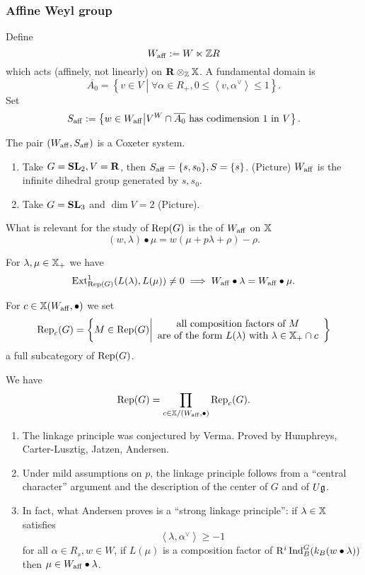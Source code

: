 \subsubsection{Affine Weyl group}
Define
\[
	W_{\mathrm{aff}} := W\ltimes \mathbb Z R
\] 
which acts (affinely, not linearly) on $\mathbf{R}\otimes_\mathbb Z \mathbb{X}$. A fundamental domain is
\[
	\overline{A_0} = \left\{ v\in V \middle| \forall \alpha\in R_+, 0\le \left<v,\alpha ^{\vee} \right>\le 1 \right\} .
\] 
Set
\[
S_{\mathrm{aff}}:= \left\{ w\in W_{\mathrm{aff}} \middle| V^{W}\cap \overline{A_0}\text{ has codimension 1 in }V \right\}. 
\] 
\begin{fact}
	The pair $(W_{\mathrm{aff}},S_{\mathrm{aff}})$ is a Coxeter system.
\end{fact}
\begin{example}\leavevmode
	\begin{enumerate}[(1)]
		\item Take $G=\mathbf{SL}_2, V=\mathbf{R}$, then $S_{\mathrm{aff}}=\{s,s_0\} , S=\{s\} $. (Picture) $W_{\mathrm{aff}}$ is the infinite dihedral group generated by $s,s_0$.
		\item Take $G=\mathbf{SL}_3$ and $\dim V=2$ (Picture).
	\end{enumerate}
\end{example}
What is relevant for the study of $\operatorname{Rep}(G)$ is the  of $W_{\mathrm{aff}}$ on $\mathbb{X}$ 
\[
	(w,\lambda)\bullet \mu = w(\mu + p\lambda + \rho) - \rho.
\] 
\begin{theorem}
	For $\lambda,\mu\in \mathbb{X}_+$ we have
	\[
	\operatorname{Ext}_{\operatorname{Rep}(G)}^{1}(L(\lambda), L(\mu)) \neq 0 \implies W_{\mathrm{aff}}\bullet \lambda = W_{\mathrm{aff}}\bullet \mu.
	\] 
\end{theorem}
For $c\in \mathbb{X}(W_{\mathrm{aff}},\bullet)$ we set
\[
	\operatorname{Rep}_c(G) = \left\{ M\in \operatorname{Rep}(G) \middle| \begin{array}{c}
		\text{all composition factors of }M \\
		\text{are of the form }L(\lambda)\text{ with }\lambda\in \mathbb{X}_+\cap c
	\end{array}\right\} 
\] 
a full subcategory of $\operatorname{Rep}(G)$.
\begin{corollary}
	We have
	\[
	\operatorname{Rep}(G) = \prod_{c\in \mathbb{X} / (W_{\mathrm{aff}},\bullet)}\operatorname{Rep}_c(G).
	\] 
\end{corollary}
\begin{remark}\leavevmode
	\begin{enumerate}[(1)]
		\item The linkage principle was conjectured by Verma. Proved by Humphreys, Carter-Lusztig, Jatzen, Andersen.
		\item Under mild assumptions on $p$, the linkage principle follows from a ``central character'' argument and the description of the center of $G$ and of $U\mathfrak g$.
		\item In fact, what Andersen proves is a ``strong linkage principle'': if $\lambda\in \mathbb{X}$ satisfies 
			\[
			\left<\lambda, \alpha ^{\vee} \right> \ge -1
			\] 
			for all $\alpha\in R_s, w\in W$, if $L(\mu)$ is a composition factor of $\mathrm{R}^{i}\operatorname{Ind}_B^{G}(k_B(w\bullet\lambda))$ then $\mu\in W_{\mathrm{aff}}\bullet \lambda$.
	\end{enumerate}
\end{remark}
